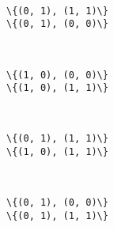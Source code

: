 \documentclass[11pt]{article}
\begin{document}
    \begin{center}
    \end{center}
    { \hspace*{\fill} \\}
    
    \begin{Verbatim}[commandchars=\\\{\}]
\{(0, 1), (1, 1)\}
\{(0, 1), (0, 0)\}

    \end{Verbatim}

    \begin{center}
    \end{center}
    { \hspace*{\fill} \\}
    
    \begin{Verbatim}[commandchars=\\\{\}]
\{(1, 0), (0, 0)\}
\{(1, 0), (1, 1)\}

    \end{Verbatim}

    \begin{center}
    \end{center}
    { \hspace*{\fill} \\}
    
    \begin{Verbatim}[commandchars=\\\{\}]
\{(0, 1), (1, 1)\}
\{(1, 0), (1, 1)\}

    \end{Verbatim}

    \begin{center}
    \end{center}
    { \hspace*{\fill} \\}
    
    \begin{Verbatim}[commandchars=\\\{\}]
\{(0, 1), (0, 0)\}
\{(0, 1), (1, 1)\}

    \end{Verbatim}

    \begin{center}
    \end{center}
    { \hspace*{\fill} \\}
    
\end{document}
